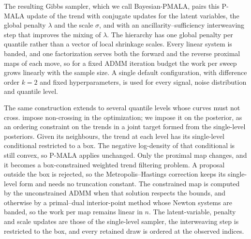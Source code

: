 The resulting Gibbs sampler, which we call Bayesian-PMALA, pairs this P-MALA update of the trend with conjugate updates for the latent variables, the global penalty $\lambda$ and the scale $\sigma$, and with an ancillarity--sufficiency interweaving step \citep{yu2011center} that improves the mixing of $\lambda$. The hierarchy has one global penalty per quantile rather than a vector of local shrinkage scales. Every linear system is banded, and one factorization serves both the forward and the reverse proximal maps of each move, so for a fixed ADMM iteration budget the work per sweep grows linearly with the sample size. A single default configuration, with difference order $k=2$ and fixed hyperparameters, is used for every signal, noise distribution and quantile level.

The same construction extends to several quantile levels whose curves must not cross. \citet{brantley2020baseline} impose non-crossing in the optimization; we impose it on the posterior, as an ordering constraint on the trends in a joint target formed from the single-level posteriors. Given its neighbours, the trend at each level has its single-level conditional restricted to a box. The negative log-density of that conditional is still convex, so P-MALA applies unchanged. Only the proximal map changes, and it becomes a box-constrained weighted trend filtering problem. A proposal outside the box is rejected, so the Metropolis--Hastings correction keeps its single-level form and needs no truncation constant. The constrained map is computed by the unconstrained ADMM when that solution respects the bounds, and otherwise by a primal--dual interior-point method whose Newton systems are banded, so the work per map remains linear in $n$. The latent-variable, penalty and scale updates are those of the single-level sampler, the interweaving step is restricted to the box, and every retained draw is ordered at the observed indices.


